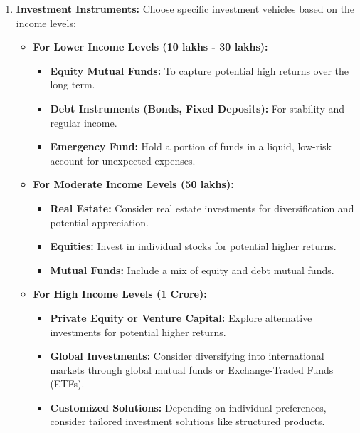 \begin{enumerate}
    \item \textbf{Investment Instruments:} Choose specific investment vehicles based on the income levels:
    \begin{itemize}
        \item \textbf{For Lower Income Levels (10 lakhs - 30 lakhs):}
        \begin{itemize}
            \item \textbf{Equity Mutual Funds:} To capture potential high returns over the long term.
            \item \textbf{Debt Instruments (Bonds, Fixed Deposits):} For stability and regular income.
            \item \textbf{Emergency Fund:} Hold a portion of funds in a liquid, low-risk account for unexpected expenses.
        \end{itemize}
        \item \textbf{For Moderate Income Levels (50 lakhs):}
        \begin{itemize}
            \item \textbf{Real Estate:} Consider real estate investments for diversification and potential appreciation.
            \item \textbf{Equities:} Invest in individual stocks for potential higher returns.
            \item \textbf{Mutual Funds:} Include a mix of equity and debt mutual funds.
        \end{itemize}
        \item \textbf{For High Income Levels (1 Crore):}
        \begin{itemize}
            \item \textbf{Private Equity or Venture Capital:} Explore alternative investments for potential higher returns.
            \item \textbf{Global Investments:} Consider diversifying into international markets through global mutual funds or Exchange-Traded Funds (ETFs).
            \item \textbf{Customized Solutions:} Depending on individual preferences, consider tailored investment solutions like structured products.
        \end{itemize}
    \end{itemize}

\end{enumerate}

